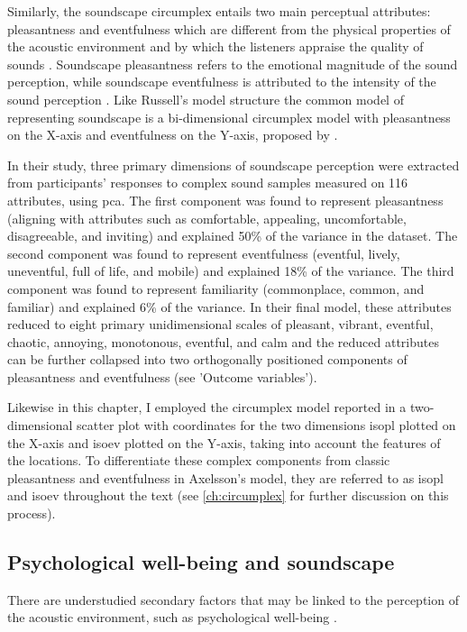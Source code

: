 Similarly, the soundscape circumplex entails two main perceptual attributes: pleasantness and eventfulness which are different from the physical properties of the acoustic environment and by which the listeners appraise the quality of sounds \citep{ISO12913Part2}. Soundscape pleasantness refers to the emotional magnitude of the sound perception, while soundscape eventfulness is attributed to the intensity of the sound perception \citep{Erfanian2019Psychophysiological}. Like Russell's model structure the common model of representing soundscape is a bi-dimensional circumplex model with pleasantness on the X-axis and eventfulness on the Y-axis, proposed by \citet{Axelsson2010principal}.

In their study, three primary dimensions of soundscape perception were extracted from participants' responses to complex sound samples measured on 116 attributes, using \gls{pca}. The first component was found to represent pleasantness (aligning with attributes such as comfortable, appealing, uncomfortable, disagreeable, and inviting) and explained 50\% of the variance in the dataset. The second component was found to represent eventfulness (eventful, lively, uneventful, full of life, and mobile) and explained 18\% of the variance. The third component was found to represent familiarity (commonplace, common, and familiar) and explained 6\% of the variance. In their final model, these attributes reduced to eight primary unidimensional scales of pleasant, vibrant, eventful, chaotic, annoying, monotonous, eventful, and calm and the reduced attributes can be further collapsed into two orthogonally positioned components of pleasantness and eventfulness (see 'Outcome variables').

Likewise in this chapter, I employed the circumplex model reported in a two-dimensional scatter plot with coordinates for the two dimensions \gls{isopl} plotted on the X-axis and \gls{isoev} plotted on the Y-axis, taking into account the features of the locations. To differentiate these complex components from classic pleasantness and eventfulness in Axelsson's model, they are referred to as \gls{isopl} and \gls{isoev} throughout the text (see \cref{ch:circumplex} for further discussion on this process).

\subsection{Psychological well-being and soundscape}

There are understudied secondary factors that may be linked to the perception of the acoustic environment, such as psychological well-being \citep{Aletta2019Associations}.

